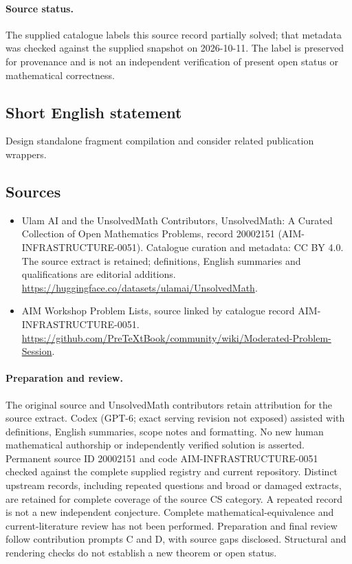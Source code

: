 \documentclass[11pt]{article}
\begin{document}
\paragraph{Source status.}
The supplied catalogue labels this source record partially solved; that metadata was checked against the supplied snapshot on 2026-10-11. The label is preserved for provenance and is not an independent verification of present open status or mathematical correctness.
\subsection{Short English statement}
Design standalone fragment compilation and consider related publication wrappers.
\subsection{Sources}
\begin{itemize}
\item[\hypertarget{source:20002151:1}{S1}] Ulam AI and the UnsolvedMath Contributors, UnsolvedMath: A Curated Collection of Open Mathematics Problems, record 20002151 (AIM-INFRASTRUCTURE-0051). Catalogue curation and metadata: CC BY 4.0. The source extract is retained; definitions, English summaries and qualifications are editorial additions.
\url{https://huggingface.co/datasets/ulamai/UnsolvedMath}.
\item[\hypertarget{source:20002151:2}{S2}] AIM Workshop Problem Lists, source linked by catalogue record AIM-INFRASTRUCTURE-0051.
\url{https://github.com/PreTeXtBook/community/wiki/Moderated-Problem-Session}.
\end{itemize}
\paragraph{Preparation and review.}
The original source and UnsolvedMath contributors retain attribution for the source extract. Codex (GPT-6; exact serving revision not exposed) assisted with definitions, English summaries, scope notes and formatting. No new human mathematical authorship or independently verified solution is asserted. Permanent source ID 20002151 and code AIM-INFRASTRUCTURE-0051 checked against the complete supplied registry and current repository. Distinct upstream records, including repeated questions and broad or damaged extracts, are retained for complete coverage of the source CS category. A repeated record is not a new independent conjecture. Complete mathematical-equivalence and current-literature review has not been performed. Preparation and final review follow contribution prompts C and D, with source gaps disclosed. Structural and rendering checks do not establish a new theorem or open status.
\label{end:20002151}
\end{document}
